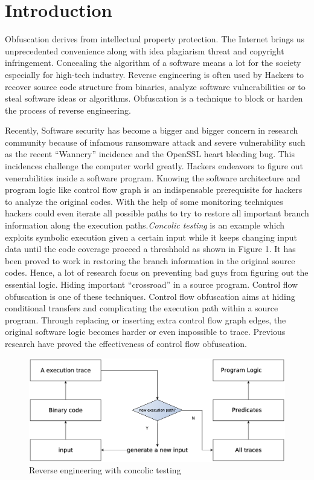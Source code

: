 \documentclass[lnicst]{svmultln}
\begin{document}
\section{Introduction}
%
Obfuscation derives from intellectual property protection. The Internet brings us unprecedented convenience along with idea plagiarism threat and copyright infringement.  Concealing the algorithm of a software means a lot for the society especially for high-tech industry. Reverse engineering is often used by Hackers to recover source code structure from binaries,  analyze software vulnerabilities or to steal software ideas or algorithms. Obfuscation is a technique to block or harden the process of reverse engineering.

Recently, Software security has become a bigger and bigger concern in research community because of infamous ransomware attack and severe vulnerability such as the recent ``Wanncry'' incidence and the OpenSSL heart bleeding bug. This incidences challenge the computer world greatly. Hackers endeavors to figure out venerabilities inside a software program. Knowing the software architecture and program logic like control flow graph is an indispensable prerequisite for hackers to analyze the original codes. With the help of some monitoring techniques hackers could even iterate all possible paths to try to restore all important branch information along the execution paths.\textit{Concolic testing} is an example which exploits symbolic execution given a certain input while it keeps changing input data until the code coverage proceed a threshhold\cite{Sen} as shown in Figure 1. It has been proved to work in restoring the branch information in the original source codes. Hence, a lot of research focus on preventing bad guys from figuring out the essential logic. Hiding important ``crossroad'' in a source program. Control flow obfuscation is one of these techniques. Control flow obfuscation aims at hiding conditional transfers and complicating the execution path within a source program. Through replacing or inserting extra control flow graph edges, the original software logic becomes harder or even impossible to trace. Previous research\cite{Ma} have proved the effectiveness of control flow obfuscation.

\begin{figure}
  \includegraphics[width=0.9\linewidth]{reverse_engineering.eps}
  \caption{Reverse engineering with concolic testing}
  \label{Figure 1}
\end{figure}
\end{document}
